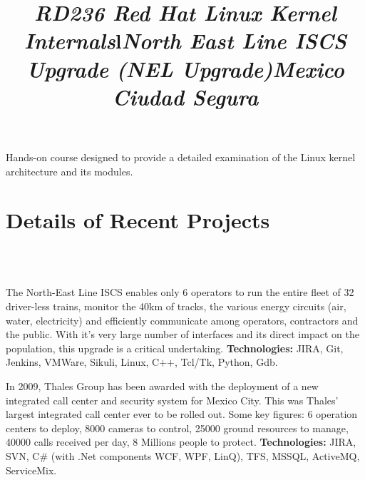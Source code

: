 \documentclass[overlapped,line,letterpaper]{res}
\begin{document}
\begin{resume}


  \title{\em RD236 Red Hat Linux Kernel Internals}
  \begin{position}
    Hands-on course designed to provide a detailed examination of the
    Linux kernel architecture and its modules.
  \end{position}



  \section{\bf Details of Recent Projects}

  \begin{format}
    \title{l}\\
    \body\\
  \end{format}

  \title{\em North East Line ISCS Upgrade (NEL Upgrade)}
  \begin{position}
    The North-East Line ISCS enables only 6 operators to run the entire fleet of
    32 driver-less trains, monitor the 40km of tracks, the various energy
    circuits (air, water, electricity) and efficiently communicate among
    operators, contractors and the public. With it's very large number of
    interfaces and its direct impact on the population, this upgrade is a
    critical undertaking.
    \newline
    {\bf Technologies:} JIRA, Git, Jenkins, VMWare, Sikuli, Linux, C++, Tcl/Tk, Python, Gdb.
  \end{position}

  \title{\em Mexico Ciudad Segura}
  \begin{position}
    In 2009, Thales Group has been awarded with the deployment of a new
    integrated call center and security system for Mexico City.  This was
    Thales' largest integrated call center ever to be rolled out. Some key
    figures: 6 operation centers to deploy, 8000 cameras to control, 25000
    ground resources to manage, 40000 calls received per day, 8 Millions people
    to protect.
    \newline
    {\bf Technologies:} JIRA, SVN, C\# (with .Net components WCF, WPF, LinQ), TFS, MSSQL, ActiveMQ,
    ServiceMix.
  \end{position}


\end{resume}
\end{document}
